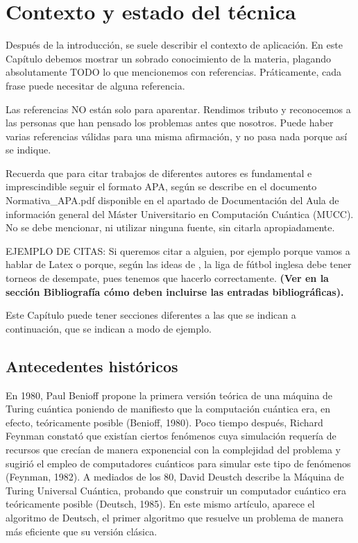 \chapter{Contexto y estado del técnica}

Después de la introducción, se suele describir el contexto de aplicación. En este Capítulo debemos mostrar un sobrado conocimiento de la materia, plagando absolutamente TODO lo que mencionemos con referencias. Práticamente, cada frase puede necesitar de alguna referencia.

Las referencias NO están solo para aparentar. Rendimos tributo y reconocemos a las personas que han pensado los problemas antes que nosotros. Puede haber varias referencias válidas para una misma afirmación, y no pasa nada porque así se indique.

Recuerda que para citar trabajos de diferentes autores es fundamental e imprescindible seguir el formato APA, según se describe en el documento Normativa\_APA.pdf disponible en el apartado de Documentación del Aula de información general del Máster Universitario en Computación Cuántica (MUCC). No se debe mencionar, ni utilizar ninguna fuente, sin citarla apropiadamente.

EJEMPLO DE CITAS: Si queremos citar a alguien, por ejemplo porque vamos a hablar de Latex \citep{lamport1994} o porque, según las ideas de \cite{ackerman2017}, la liga de fútbol inglesa debe tener torneos de desempate, pues tenemos que hacerlo correctamente. {\bf{(Ver en la sección Bibliografía cómo deben incluirse las entradas bibliográficas).}}

Este Capítulo puede tener secciones diferentes a las que se indican a continuación, que se indican a modo de ejemplo.

\section{Antecedentes históricos}

En 1980, Paul Benioff propone la primera versión teórica de una máquina de Turing cuántica poniendo de manifiesto que la computación cuántica era, en efecto, teóricamente posible (Benioff, 1980). Poco tiempo después, Richard Feynman constató que existían ciertos fenómenos cuya simulación requería de recursos que crecían de manera exponencial con la complejidad del problema y sugirió el empleo de computadores cuánticos para simular este tipo de fenómenos (Feynman, 1982). A mediados de los 80, David Deustch describe la Máquina de Turing Universal Cuántica, probando que construir un computador cuántico era teóricamente posible (Deutsch, 1985). En este mismo artículo, aparece el algoritmo de Deutsch, el primer algoritmo que resuelve un problema de manera más eficiente que su versión clásica.

